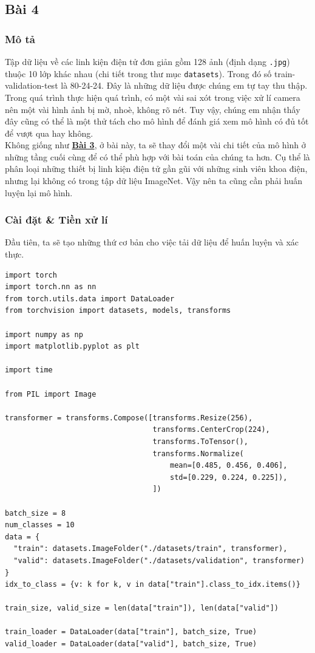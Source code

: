 \documentclass[a4paper]{article}
\begin{document}
\subsection{Bài 4}
\subsubsection{Mô tả}
Tập dữ liệu về các linh kiện điện tử đơn giản gồm 128 ảnh (định dạng \texttt{.jpg}) thuộc 10 lớp khác nhau (chi tiết trong thư mục \texttt{datasets}). Trong đó số train-validation-test là 80-24-24. Đây là những dữ liệu được chúng em tự tay thu thập. Trong quá trình thực hiện quá trình, có một vài sai xót trong việc xử lí camera nên một vài hình ảnh bị mờ, nhoè, không rõ nét. Tuy vậy, chúng em nhận thấy đây cũng có thể là một thử tách cho mô hình để đánh giá xem mô hình có đủ tốt để vượt qua hay không.\\
Không giống như \hyperref[bai3]{\textbf{Bài 3}}, ở bài này, ta sẽ thay đổi một vài chi tiết của mô hình ở những tầng cuối cùng để có thể phù hợp với bài toán của chúng ta hơn. Cụ thể là phân loại những thiết bị linh kiện điện tử gần gũi với những sinh viên khoa điện, nhưng lại không có trong tập dữ liệu ImageNet. Vậy nên ta cũng cần phải huấn luyện lại mô hình.
\subsubsection{Cài đặt \& Tiền xử lí}
Đầu tiên, ta sẽ tạo những thứ cơ bản cho việc tải dữ liệu để huấn luyện và xác thực.
\begin{lstlisting}
import torch
import torch.nn as nn
from torch.utils.data import DataLoader
from torchvision import datasets, models, transforms

import numpy as np
import matplotlib.pyplot as plt

import time

from PIL import Image

transformer = transforms.Compose([transforms.Resize(256),
                                  transforms.CenterCrop(224),
                                  transforms.ToTensor(),
                                  transforms.Normalize(
                                      mean=[0.485, 0.456, 0.406],
                                      std=[0.229, 0.224, 0.225]),
                                  ])

batch_size = 8
num_classes = 10
data = {
  "train": datasets.ImageFolder("./datasets/train", transformer),
  "valid": datasets.ImageFolder("./datasets/validation", transformer)
}
idx_to_class = {v: k for k, v in data["train"].class_to_idx.items()}

train_size, valid_size = len(data["train"]), len(data["valid"])

train_loader = DataLoader(data["train"], batch_size, True)
valid_loader = DataLoader(data["valid"], batch_size, True)
\end{lstlisting}
\end{document}
